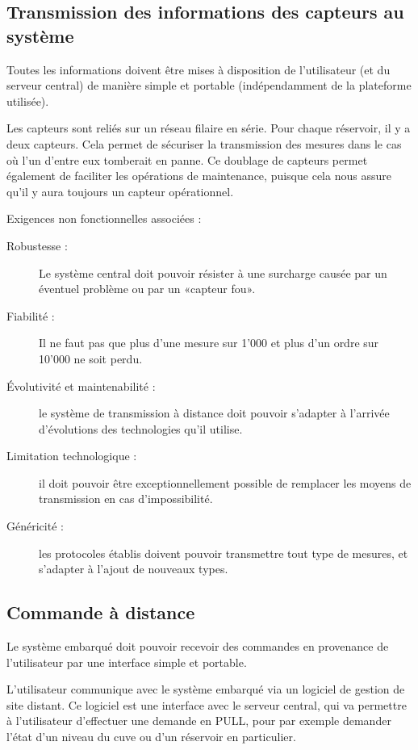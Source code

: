 \documentclass{mise_en_page}
\begin{document}
\subsection{Transmission des informations des capteurs au système}
Toutes les informations doivent être mises à disposition de
l’utilisateur (et du serveur central) de manière simple et portable
(indépendamment de la plateforme utilisée).

Les capteurs sont reliés sur un réseau filaire en série. Pour chaque
réservoir, il y a deux capteurs. Cela permet de sécuriser la
transmission des mesures dans le cas où l’un d’entre eux tomberait en
panne. Ce doublage de capteurs permet également de faciliter les
opérations de maintenance, puisque cela nous assure qu’il y aura
toujours un capteur opérationnel.

Exigences non fonctionnelles associées :

\begin{description}
\item[Robustesse :] Le système central doit pouvoir résister à une
surcharge causée par un éventuel problème ou par un «capteur fou».
\item[Fiabilité :] Il ne faut pas que plus d’une mesure sur 1’000 et plus
d’un ordre sur 10’000 ne soit perdu.
\item[Évolutivité et maintenabilité :] le système de transmission à
distance doit pouvoir s’adapter à l’arrivée d’évolutions des
technologies qu’il utilise.
\item[Limitation technologique :] il doit pouvoir être exceptionnellement
possible de remplacer les moyens de transmission en cas
d’impossibilité.
\item[Généricité :] les protocoles établis doivent pouvoir transmettre
tout type de mesures, et s’adapter à l’ajout de nouveaux types.
\end{description}
\subsection{Commande à distance}
Le système embarqué doit pouvoir recevoir des commandes en provenance de
l’utilisateur par une interface simple et portable.

L’utilisateur communique avec le système embarqué via un logiciel de
gestion de site distant. Ce logiciel est une interface avec le serveur
central, qui va permettre à l’utilisateur d’effectuer une demande en
PULL, pour par exemple demander l’état d’un niveau du cuve ou d’un
réservoir en particulier.
\end{document}
